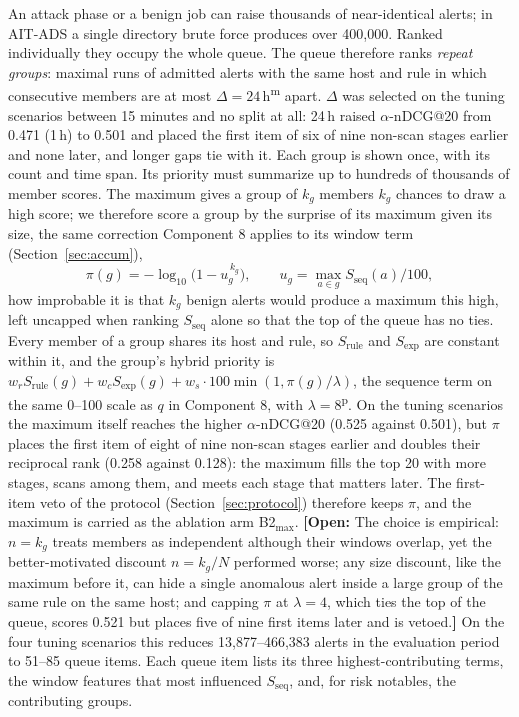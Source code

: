 \documentclass[conference]{IEEEtran}
\newcommand{\open}[1]{\textcolor{blue!70!black}{\textbf{[Open:} #1\textbf{]}}}
\newcommand{\prov}{\textsuperscript{\textcolor{orange!80!black}{p}}}   %
\newcommand{\meas}{\textsuperscript{\textcolor{green!45!black}{m}}}    %
\begin{document}
An attack phase or a benign job can raise thousands of near-identical alerts; in AIT-ADS a single directory brute force produces over 400{,}000. Ranked individually they occupy the whole queue. The queue therefore ranks \emph{repeat groups}: maximal runs of admitted alerts with the same host and rule in which consecutive members are at most $\Delta = 24$\,h\meas{} apart. $\Delta$ was selected on the tuning scenarios between 15 minutes and no split at all: 24\,h raised $\alpha$-nDCG@20 from 0.471 (1\,h) to 0.501 and placed the first item of six of nine non-scan stages earlier and none later, and longer gaps tie with it. Each group is shown once, with its count and time span. Its priority must summarize up to hundreds of thousands of member scores. The maximum gives a group of $k_g$ members $k_g$ chances to draw a high score; we therefore score a group by the surprise of its maximum given its size, the same correction Component 8 applies to its window term (Section~\ref{sec:accum}),
\begin{equation}
\pi(g) = -\log_{10}\!\big(1 - u_g^{\,k_g}\big), \qquad u_g = \max_{a \in g} S_\mathrm{seq}(a)/100,
\end{equation}
how improbable it is that $k_g$ benign alerts would produce a maximum this high, left uncapped when ranking $S_\mathrm{seq}$ alone so that the top of the queue has no ties. Every member of a group shares its host and rule, so $S_\mathrm{rule}$ and $S_\mathrm{exp}$ are constant within it, and the group's hybrid priority is $w_r S_\mathrm{rule}(g) + w_c S_\mathrm{exp}(g) + w_s \cdot 100 \min(1, \pi(g)/\lambda)$, the sequence term on the same 0--100 scale as $q$ in Component 8, with $\lambda = 8$\prov{}. On the tuning scenarios the maximum itself reaches the higher $\alpha$-nDCG@20 (0.525 against 0.501), but $\pi$ places the first item of eight of nine non-scan stages earlier and doubles their reciprocal rank (0.258 against 0.128): the maximum fills the top 20 with more stages, scans among them, and meets each stage that matters later. The first-item veto of the protocol (Section~\ref{sec:protocol}) therefore keeps $\pi$, and the maximum is carried as the ablation arm B2$_\mathrm{max}$. \open{The choice is empirical: $n = k_g$ treats members as independent although their windows overlap, yet the better-motivated discount $n = k_g/N$ performed worse; any size discount, like the maximum before it, can hide a single anomalous alert inside a large group of the same rule on the same host; and capping $\pi$ at $\lambda = 4$, which ties the top of the queue, scores 0.521 but places five of nine first items later and is vetoed.} On the four tuning scenarios this reduces 13{,}877--466{,}383 alerts in the evaluation period to 51--85 queue items. Each queue item lists its three highest-contributing terms, the window features that most influenced $S_\mathrm{seq}$, and, for risk notables, the contributing groups.
\end{document}
